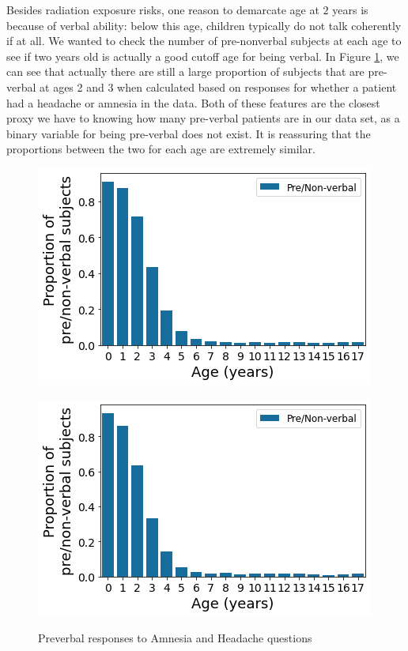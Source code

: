 \documentclass[11pt, letterpaper]{amsart}
\begin{document}
Besides radiation exposure risks, one reason to demarcate age at $2$ years is because of verbal ability: below this age, children typically do not talk coherently if at all. We wanted to check the number of pre-nonverbal subjects at each age to see if two years old is actually a good cutoff age for being verbal. In Figure \ref{fig:preverbal}, we can see that actually there are still a large proportion of subjects that are pre-verbal at ages 2 and 3 when calculated based on responses for whether a patient had a headache or amnesia in the data. Both of these features are the closest proxy we have to knowing how many pre-verbal patients are in our data set, as a binary variable for being pre-verbal does not exist. It is reassuring that the proportions between the two for each age are extremely similar. 
\begin{figure}
	\begin{minipage}[b]{0.5\linewidth}
		\centering
		\includegraphics[width=\textwidth]{amnesia_preverbal.png}
		\label{fig:amnesia_preverbal}
	\end{minipage}%
	\begin{minipage}[b]{0.5\linewidth}
		\centering
		\includegraphics[width=\textwidth]{headache_preverbal.png}
		\label{fig:headache_preverbal}
	\end{minipage}
	\caption{Preverbal responses to Amnesia and Headache questions}\label{fig:preverbal}
\end{figure}
\end{document}
